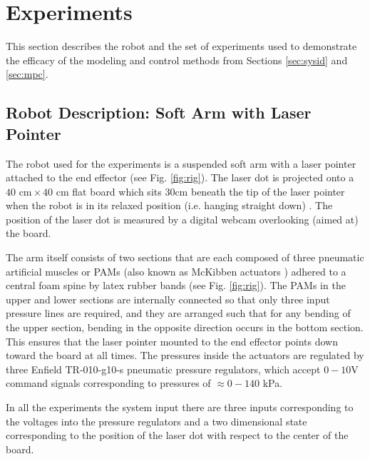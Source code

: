 \section{Experiments}
\label{sec:experiments}

This section describes the robot and the set of experiments used to demonstrate the efficacy of the modeling and control methods from Sections \ref{sec:sysid} and \ref{sec:mpc}.

\subsection{Robot Description: Soft Arm with Laser Pointer}
\label{sec:robot}

The robot used for the experiments is a suspended soft arm with a laser pointer attached to the end effector (see Fig. \ref{fig:rig}). 
The laser dot is projected onto a ${40\text{ cm} \times 40\text{ cm}}$ flat board which sits $30\text{cm}$ beneath the tip of the laser pointer when the robot is in its relaxed position (i.e. hanging straight down) .
The position of the laser dot is measured by a digital webcam overlooking (aimed at) the board.

The arm itself consists of two sections that are each composed of three pneumatic artificial muscles or PAMs (also known as McKibben actuators \cite{tondu2012modelling}) adhered to a central foam spine by latex rubber bands (see Fig. \ref{fig:rig}).
The PAMs in the upper and lower sections are internally connected so that only three input pressure lines are required, and
they are arranged such that for any bending of the upper section, bending in the opposite direction occurs in the bottom section.
This ensures that the laser pointer mounted to the end effector points down toward the board at all times.
The pressures inside the actuators are regulated by three Enfield TR-010-g10-s pneumatic pressure regulators, which accept ${0-10}$V command signals corresponding to pressures of ${ \approx 0 - 140 }$ kPa.

In all the experiments the system input there are three inputs corresponding to the voltages into the pressure regulators and a two dimensional state corresponding to the position of the laser dot with respect to the center of the board.

